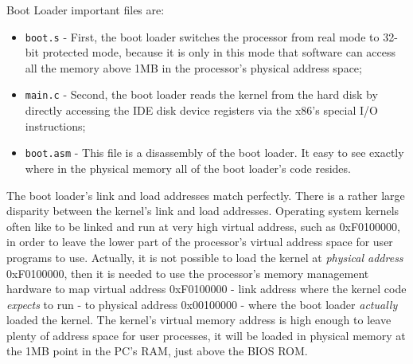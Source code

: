 Boot Loader important files are:
\begin{itemize}
\item \texttt{boot.s} - First, the boot loader switches the processor from real mode to 32-bit protected mode, because  it is only in this mode that software can access all the memory above 1MB in the processor's physical address space;
\item \texttt{main.c} - Second, the boot loader reads the kernel from the hard disk by directly accessing the IDE disk device registers via the x86's special I/O instructions;
\item \texttt{boot.asm} - This file is a disassembly of the boot loader. It easy to see exactly where in the physical memory all of the boot loader's code resides.
\end{itemize}

The boot loader's link and load addresses match perfectly. There is a rather large disparity between the kernel's link and load addresses. Operating system kernels often like to be linked and run at very high virtual address, such as 0xF0100000, in order to leave the lower part of the processor's virtual address space for user programs to use. Actually, it is not possible to load the kernel at \textit{physical address} 0xF0100000, then it is needed to use the processor's memory management hardware to map virtual address 0xF0100000 - link address where the kernel code \emph{expects} to run - to physical address 0x00100000 - where the boot loader \textit{actually} loaded the kernel. The kernel's virtual memory address is high enough to leave plenty of address space for user processes, it will be loaded in physical memory at the 1MB point in the PC's RAM, just above the BIOS ROM.

